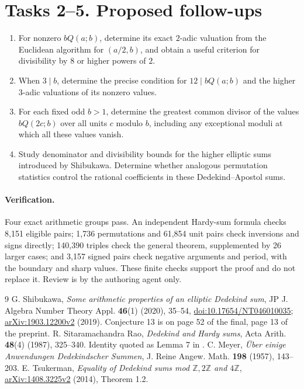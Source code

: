 \documentclass[11pt]{article}
\newcommand{\Z}{\mathbb Z}
\begin{document}
\section*{Tasks 2--5. Proposed follow-ups}
\begin{enumerate}[label=\textbf{Task \arabic*.},start=2,leftmargin=*]
\item For nonzero $bQ(a;b)$, determine its exact $2$-adic valuation
from the Euclidean algorithm for $(a/2,b)$, and obtain a useful
criterion for divisibility by $8$ or higher powers of $2$.
\item When $3\mid b$, determine the precise condition for
$12\mid bQ(a;b)$ and the higher $3$-adic valuations of its nonzero
values.
\item For each fixed odd $b>1$, determine the greatest common
divisor of the values $bQ(2c;b)$ over all units $c$ modulo $b$,
including any exceptional moduli at which all these values vanish.
\item Study denominator and divisibility bounds for the higher
elliptic sums introduced by Shibukawa. Determine whether analogous
permutation statistics control the rational coefficients in these
Dedekind--Apostol sums.
\end{enumerate}

\paragraph{Verification.}
Four exact arithmetic groups pass. An independent Hardy-sum formula
checks 8,151 eligible pairs; 1,736 permutations and 61,854 unit pairs
check inversions and signs directly; 140,390 triples check the general
theorem, supplemented by 26 larger cases; and 3,157 signed pairs check
negative arguments and period, with the boundary and sharp values.
These finite checks support the proof and do not replace it.
Review is by the authoring agent only.

\begin{thebibliography}{9}
 G. Shibukawa,
\emph{Some arithmetic properties of an elliptic Dedekind sum},
JP J. Algebra Number Theory Appl. \textbf{46}(1) (2020), 35--54,
\href{https://doi.org/10.17654/NT046010035}{doi:10.17654/NT046010035};
\href{https://arxiv.org/abs/1903.12200}{arXiv:1903.12200v2} (2019).
Conjecture 13 is on page 52 of the final, page 13 of the preprint.
 R. Sitaramachandra Rao,
\emph{Dedekind and Hardy sums}, Acta Arith. \textbf{48}(4) (1987),
325--340. Identity quoted as Lemma 7 in \cite{S}.
 C. Meyer,
\emph{\"Uber einige Anwendungen Dedekindscher Summen},
J. Reine Angew. Math. \textbf{198} (1957), 143--203.
 E. Tsukerman,
\emph{Equality of Dedekind sums mod $\Z,2\Z$ and $4\Z$},
\href{https://arxiv.org/abs/1408.3225}{arXiv:1408.3225v2} (2014),
Theorem 1.2.
\end{thebibliography}
\end{document}
